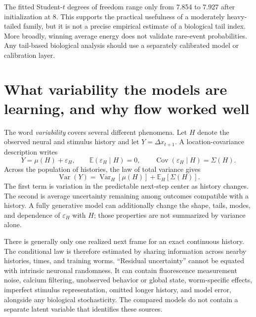 \documentclass[11pt]{article}
\newcommand{\E}{\mathbb{E}}
\begin{document}
The fitted Student-$t$ degrees of freedom range only from 7.854 to 7.927 after initialization at 8. This supports the practical usefulness of a moderately heavy-tailed family, but it is not a precise empirical estimate of a biological tail index. More broadly, winning average energy does not validate rare-event probabilities. Any tail-based biological analysis should use a separately calibrated model or calibration layer.

\section{What variability the models are learning, and why flow worked well}

The word \emph{variability} covers several different phenomena. Let $H$ denote the observed neural and stimulus history and let $Y=\Delta x_{t+1}$. A location-covariance description writes
\begin{equation}
 Y=\mu(H)+\varepsilon_H,\qquad
 \E(\varepsilon_H\mid H)=0,\qquad
 \operatorname{Cov}(\varepsilon_H\mid H)=\Sigma(H).
 \label{eq:varianceparts}
\end{equation}
Across the population of histories, the law of total variance gives
\begin{equation}
 \operatorname{Var}(Y)
 =\operatorname{Var}_{H}\!\left[\mu(H)\right]
 +\E_H\!\left[\Sigma(H)\right].
 \label{eq:totalvariance}
\end{equation}
The first term is variation in the predictable next-step center as history changes. The second is average uncertainty remaining among outcomes compatible with a history. A fully generative model can additionally change the shape, tails, modes, and dependence of $\varepsilon_H$ with $H$; those properties are not summarized by variance alone.

There is generally only one realized next frame for an exact continuous history. The conditional law is therefore estimated by sharing information across nearby histories, times, and training worms. ``Residual uncertainty'' cannot be equated with intrinsic neuronal randomness. It can contain fluorescence measurement noise, calcium filtering, unobserved behavior or global state, worm-specific effects, imperfect stimulus representation, omitted longer history, and model error, alongside any biological stochasticity. The compared models do not contain a separate latent variable that identifies these sources.
\end{document}

